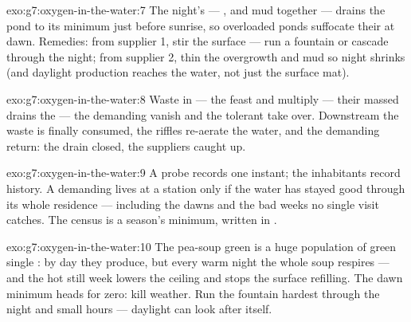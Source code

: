 \begin{solution}{exo:g7:oxygen-in-the-water:7}
The night's  --- ,  and mud
 together --- drains the pond to its minimum
just before sunrise, so overloaded ponds suffocate their
 at dawn. Remedies: from supplier 1, stir the surface
--- run a fountain or cascade through the night; from
supplier 2, thin the overgrowth and mud so night
 shrinks (and daylight production reaches the
water, not just the surface mat).
\end{solution}

\begin{solution}{exo:g7:oxygen-in-the-water:8}
Waste in --- the  feast and multiply --- their
massed  drains the  --- the demanding
 vanish and the tolerant take over. Downstream the
waste is finally consumed, the riffles re-aerate the water,
and the demanding  return: the drain closed, the
suppliers caught up.
\end{solution}

\begin{solution}{exo:g7:oxygen-in-the-water:9}
A probe records one instant; the inhabitants record
history. A demanding  lives at a station only if the
water has stayed good through its whole residence ---
including the dawns and the bad weeks no single visit
catches. The census is a season's minimum, written in
.
\end{solution}

\begin{solution}{exo:g7:oxygen-in-the-water:10}
The pea-soup green is a huge population of green single
: by day they produce, but every warm night the whole
soup respires --- and the hot still week lowers the ceiling
and stops the surface refilling. The dawn minimum heads for
zero:  kill weather. Run the fountain hardest through
the night and small hours --- daylight can look after
itself.
\end{solution}

